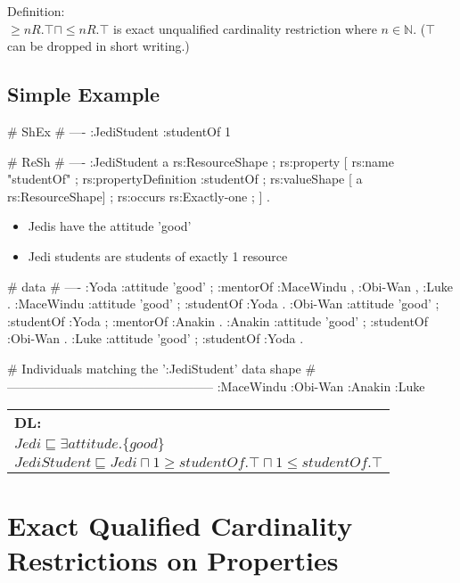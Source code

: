 \documentclass{llncs}
\newenvironment{DL}{
  \scriptsize
  \sffamily
  \vspace{0.3cm}
  \begin{tabular}{l}
	\textbf{DL:} \\

}{
  \end{tabular}
  \linebreak
}
\newcommand{\tb}[1]{\todo[size=\small, color=blue!40]{\textbf{Thomas:} #1}}
\begin{document}
Definition:\\

$\geq n R. \top \sqcap \leq n R. \top $ is exact unqualified cardinality restriction where $n \in \mathbb{N}$. ($\top$ can be dropped in short writing.)
\subsection{Simple Example}


\begin{ex}
# ShEx
# ----
:JediStudent {
    :studentOf {}{1} }
\end{ex}

\begin{ex}
# ReSh
# ----
:JediStudent a rs:ResourceShape ;
    rs:property [
        rs:name "studentOf" ;
        rs:propertyDefinition :studentOf ;
        rs:valueShape [ a rs:ResourceShape] ;
        rs:occurs rs:Exactly-one ; ] .
\end{ex}

\begin{itemize}
	\item Jedis have the attitude 'good'
	\item Jedi students are students of exactly 1 resource
\end{itemize}

\begin{ex}
# data
# ----
:Yoda 
    :attitude 'good' ;
    :mentorOf :MaceWindu , :Obi-Wan , :Luke .
:MaceWindu
    :attitude 'good' ;
    :studentOf :Yoda .
:Obi-Wan 
    :attitude 'good' ;
    :studentOf :Yoda ;
    :mentorOf :Anakin .
:Anakin
    :attitude 'good' ; 
    :studentOf :Obi-Wan .
:Luke
    :attitude 'good' ;
    :studentOf :Yoda .
\end{ex}

\begin{ex}
# Individuals matching the ’:JediStudent’ data shape
# --------------------------------------------------
:MaceWindu :Obi-Wan :Anakin :Luke
\end{ex}

\begin{DL}
$Jedi \sqsubseteq \exists attitude.\{good\} $\\
$JediStudent \sqsubseteq Jedi \sqcap 1\geq studentOf.\top \sqcap 1\leq studentOf.\top$ \\
\end{DL}
\section{Exact Qualified Cardinality Restrictions on Properties}
\end{document}

